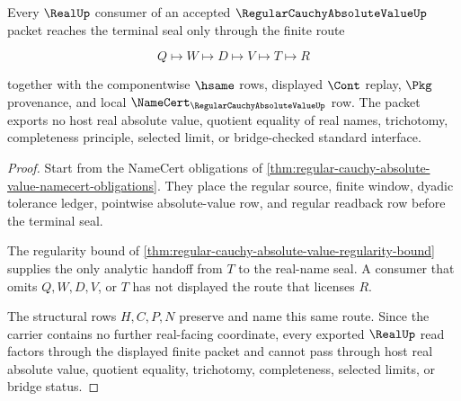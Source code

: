 \begin{theorem}
\label{thm:regular-cauchy-absolute-value-real-seal-handoff}
Every $\RealUp$ consumer of an accepted $\RegularCauchyAbsoluteValueUp$ packet reaches the terminal seal only through the finite route

$$
Q\longmapsto W\longmapsto D\longmapsto V\longmapsto T\longmapsto R
$$

together with the componentwise $\hsame$ rows, displayed $\Cont$ replay, $\Pkg$ provenance, and local $\NameCert_{\RegularCauchyAbsoluteValueUp}$ row. The packet exports no host real absolute value, quotient equality of real names, trichotomy, completeness principle, selected limit, or bridge-checked standard interface.
\end{theorem}
\begin{proof}
Start from the NameCert obligations of \autoref{thm:regular-cauchy-absolute-value-namecert-obligations}. They place the regular source, finite window, dyadic tolerance ledger, pointwise absolute-value row, and regular readback row before the terminal seal.

The regularity bound of \autoref{thm:regular-cauchy-absolute-value-regularity-bound} supplies the only analytic handoff from $T$ to the real-name seal. A consumer that omits $Q,W,D,V$, or $T$ has not displayed the route that licenses $R$.

The structural rows $H,C,P,N$ preserve and name this same route. Since the carrier contains no further real-facing coordinate, every exported $\RealUp$ read factors through the displayed finite packet and cannot pass through host real absolute value, quotient equality, trichotomy, completeness, selected limits, or bridge status.
\end{proof}



